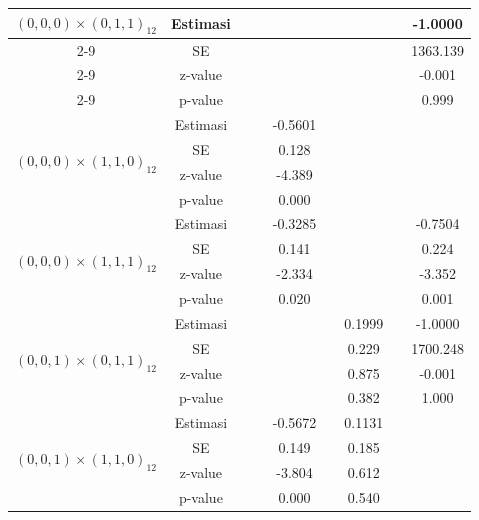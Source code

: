 \begin{enumerate}[label=\alph*.]
\begin{longtable}{|c|c|c|c|c|c|c|c|c|}
            \multirow{4}{*}{$(0,0,0)\times(0,1,1)_{12}$}
            & Estimasi & {} & {} & {} & {} & {} & {} & -1.0000 \\ \cline{2-9}
            & SE       & {} & {} & {} & {} & {} & {} & 1363.139\\ \cline{2-9}
            & z-value  &  {}   & {} & {} & {} & {} & {} & -0.001 \\ \cline{2-9}
            & p-value  & {} & {} & {} & {} & {} & {} & 0.999 \\ \hline

            \multirow{4}{*}{$(0,0,0)\times(1,1,0)_{12}$}
            & Estimasi & {} & {} & -0.5601 & {} & {} & {} & {} \\ \cline{2-9}
            & SE       & {} & {} & 0.128 & {} & {} & {} & {}\\ \cline{2-9}
            & z-value  & {} & {} & -4.389 & {} & {} & {} & {}\\ \cline{2-9}
            & p-value  & {} & {} & 0.000 & {} & {} & {} & {}\\ \hline

            \multirow{4}{*}{$(0,0,0)\times(1,1,1)_{12}$}
            & Estimasi & {} & {} & -0.3285 & {} & {} & {} & -0.7504\\ \cline{2-9}
            & SE       & {} & {} & 0.141 & {} & {} & {} & 0.224\\ \cline{2-9}
            & z-value  & {} & {} & -2.334 & {}   & {}   & {} & -3.352\\ \cline{2-9}
            & p-value  & {} & {} & 0.020 & {} & {} & {} & 0.001\\ \hline

            \multirow{4}{*}{$(0,0,1)\times(0,1,1)_{12}$}
            & Estimasi & {} & {} & {} & {} & 0.1999 & {} & -1.0000 \\ \cline{2-9}
            & SE       & {} & {} & {} & {} & 0.229 & {} & 1700.248\\ \cline{2-9}
            & z-value  & {} & {} & {} & {} & 0.875 & {} & -0.001\\ \cline{2-9}
            & p-value  & {} & {} & {} & {} & 0.382 & {} & 1.000\\ \hline

            \multirow{4}{*}{$(0,0,1)\times(1,1,0)_{12}$}
            & Estimasi & {} & {} & -0.5672 & {}  & 0.1131 & {} & {}\\ \cline{2-9}
            & SE       & {} & {} & 0.149 & {} & 0.185 & {} & {}\\ \cline{2-9}
            & z-value  & {} & {} & -3.804 & {} & 0.612 & {} & {}\\ \cline{2-9}
            & p-value  & {} & {} & 0.000 & {} & 0.540 & {} & {} \\ \hline


\end{longtable}
\end{enumerate}
